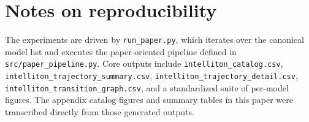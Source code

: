 \documentclass[11pt]{article}
\begin{document}
\section{Notes on reproducibility}
The experiments are driven by \texttt{run\_paper.py}, which iterates over the canonical model list and executes the paper-oriented pipeline defined in \texttt{src/paper\_pipeline.py}. Core outputs include \texttt{intelliton\_catalog.csv}, \texttt{intelliton\_trajectory\_summary.csv}, \texttt{intelliton\_trajectory\_detail.csv}, \texttt{intelliton\_transition\_graph.csv}, and a standardized suite of per-model figures. The appendix catalog figures and summary tables in this paper were transcribed directly from those generated outputs.



\end{document}
